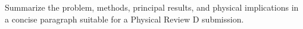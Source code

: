 Summarize the problem, methods, principal results, and physical implications in a concise paragraph suitable for a Physical Review D submission.
